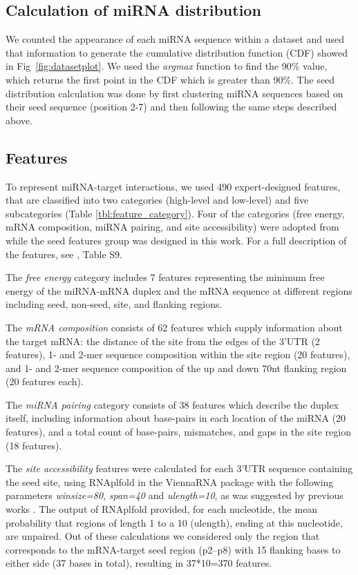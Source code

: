 \documentclass{bmcart}
\begin{document}
\subsection*{Calculation of miRNA distribution} \label{miRNAdistribution2}
We counted the appearance of each miRNA sequence within a dataset and used that information to generate the cumulative distribution function (CDF) showed in Fig~\ref{fig:datasetplot}. We used the \textit{argmax} function to find the 90\% value, which returns the first point in the CDF which is greater than 90\%. 
The seed distribution calculation was done by first clustering miRNA sequences based on their seed sequence (position 2-7) and then following the same steps described above.


\subsection*{Features} \label{methods_features}
To represent miRNA-target interactions, we used 490 expert-designed features, that are classified into two categories (high-level and low-level) and five subcategories (Table \ref{tbl:feature_category}). Four of the categories (free energy, mRNA composition, miRNA pairing, and site accessibility) were adopted from \cite{wen2018deepmirtar} while the seed features group was designed in this work. For a full description of the features, see ,  Table S9.



The \textit{free energy} category includes 7 features representing the minimum free energy of the miRNA-mRNA duplex and the mRNA sequence at different regions including seed, non-seed, site, and flanking regions. 

The \textit{mRNA composition} consists of 62 features which supply information about the target mRNA: the distance of the site from the edges of the 3'UTR (2 features), 1- and 2-mer sequence composition within the site region (20 features), and 1- and 2-mer sequence composition of the up and down 70nt flanking region (20 features each). 

The \textit{miRNA pairing} category consists of 38 features which describe the duplex itself, including information about base-pairs in each location of the miRNA (20 features), and a total count of base-pairs, mismatches, and gaps in the site region (18 features).

The \textit{site accessibility} features were calculated for each 3'UTR sequence containing the seed site, using RNAplfold in the ViennaRNA package \cite{lorenz2011viennarna} with the following parameters \textit{winsize=80}, \textit{span=40} and \textit{ulength=10}, as was suggested by previous works \cite{menor2014mirmark, wen2018deepmirtar}. The output of RNAplfold provided, for each nucleotide, the mean probability that regions of length 1 to a 10 (ulength), ending at this nucleotide, are unpaired. Out of these calculations we considered only the region that corresponds to the mRNA-target seed region (p2–p8) with 15 flanking bases to either side (37 bases in total), resulting in 37*10=370 features.
\end{document}
